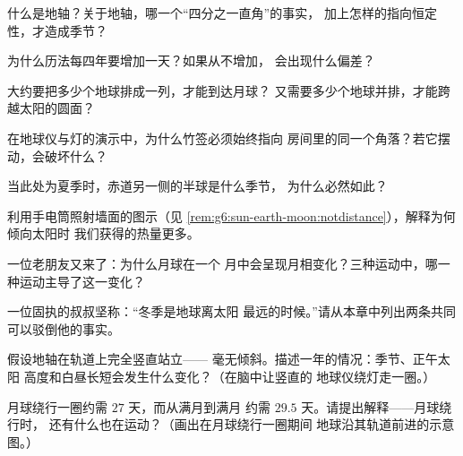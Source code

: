 \begin{exercise}[$\star$]\label{exo:g6:sun-earth-moon:2}
什么是地轴？关于地轴，哪一个“四分之一直角”的事实，
加上怎样的指向恒定性，才造成季节？
\end{exercise}

\begin{exercise}[$\star$]\label{exo:g6:sun-earth-moon:3}
为什么历法每四年要增加一天？如果从不增加，
会出现什么偏差？
\end{exercise}

\begin{exercise}[$\star$]\label{exo:g6:sun-earth-moon:4}
大约要把多少个地球排成一列，才能到达月球？
又需要多少个地球并排，才能跨越太阳的圆面？
\end{exercise}

\begin{exercise}[$\star$]\label{exo:g6:sun-earth-moon:5}
在地球仪与灯的演示中，为什么竹签必须始终指向
房间里的同一个角落？若它摆动，会破坏什么？
\end{exercise}

\begin{exercise}[$\star$]\label{exo:g6:sun-earth-moon:6}
当此处为夏季时，赤道另一侧的半球是什么季节，
为什么必然如此？
\end{exercise}

\begin{exercise}[$\star$]\label{exo:g6:sun-earth-moon:7}
利用手电筒照射墙面的图示（见
\cref{rem:g6:sun-earth-moon:notdistance}），解释为何倾向太阳时
我们获得的热量更多。
\end{exercise}

\begin{exercise}[$\star$]\label{exo:g6:sun-earth-moon:8}
一位老朋友又来了：为什么月球在一个
月中会呈现月相变化？三种运动中，哪一种运动主导了这一变化？
\end{exercise}

\begin{exercise}[$\star\star$]\label{exo:g6:sun-earth-moon:9}
一位固执的叔叔坚称：“冬季是地球离太阳
最远的时候。”请从本章中列出两条共同
可以驳倒他的事实。
\end{exercise}

\begin{exercise}[$\star\star$]\label{exo:g6:sun-earth-moon:10}
假设地轴在轨道上完全竖直站立——
毫无倾斜。描述一年的情况：季节、正午太阳
高度和白昼长短会发生什么变化？（在脑中让竖直的
地球仪绕灯走一圈。）
\end{exercise}

\begin{exercise}[$\star\star$]\label{exo:g6:sun-earth-moon:11}
月球绕行一圈约需 $27$ 天，而从满月到满月
约需 $29.5$ 天。请提出解释——月球绕行时，
还有什么也在运动？（画出在月球绕行一圈期间
地球沿其轨道前进的示意图。）
\end{exercise}

